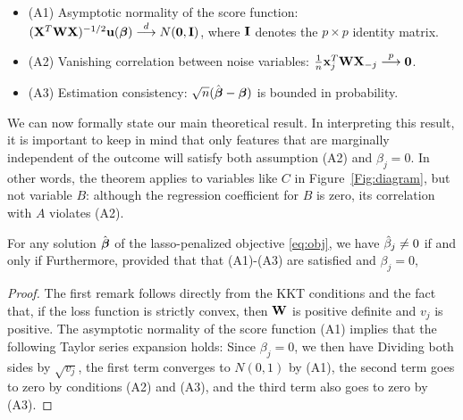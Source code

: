 \begin{itemize}
\item (A1) Asymptotic normality of the score function: $(\mathbf{X}^T\mathbf{W}\mathbf{X})^{-1/2}\mathbf{u}(\boldsymbol{\beta}) \overset{d}{\longrightarrow} N(\mathbf{0},  \mathbf{I})$, where $\mathbf{I}$ denotes the $p \times p$ identity matrix.
\item (A2) Vanishing correlation between noise variables: $\frac{1}{n}\mathbf{x}_j^T\mathbf{W}\mathbf{X}_{-j} \overset{p}{\longrightarrow} \mathbf{0}$.
\item (A3) Estimation consistency: $\sqrt{n}(\hat{\boldsymbol{\beta}}-  \boldsymbol{\beta})$ is bounded in probability.
\end{itemize}

We can now formally state our main theoretical result.  In interpreting this result, it is important to keep in mind that only features that are marginally independent of the outcome will satisfy both assumption (A2) and $\beta_j=0$.
In other words, the theorem applies to variables like $C$ in Figure~\ref{Fig:diagram}, but not variable $B$: although the regression coefficient for $B$ is zero, its correlation with $A$ violates (A2).

\begin{theorem}
  \label{Thm:main}
  For any solution $\hat{\boldsymbol{\beta}}$ of the lasso-penalized objective \eqref{eq:obj}, we have $\hat{\beta}_j \neq 0$ if and only if
  Furthermore, provided that that (A1)-(A3) are satisfied and $\beta_j=0$,
\end{theorem}

\begin{proof}
  The first remark follows directly from the KKT conditions and the fact that, if the loss function is strictly convex, then $\mathbf{W}$ is positive definite and $v_j$ is positive.  The asymptotic normality of the score function (A1) implies that the following Taylor series expansion holds:
Since $\beta_j=0$, we then have
Dividing both sides by $\sqrt{v_j}$, the first term converges to $N(0,1)$ by (A1), the second term goes to zero by conditions (A2) and (A3), and the third term also goes to zero by (A3).
\end{proof}

